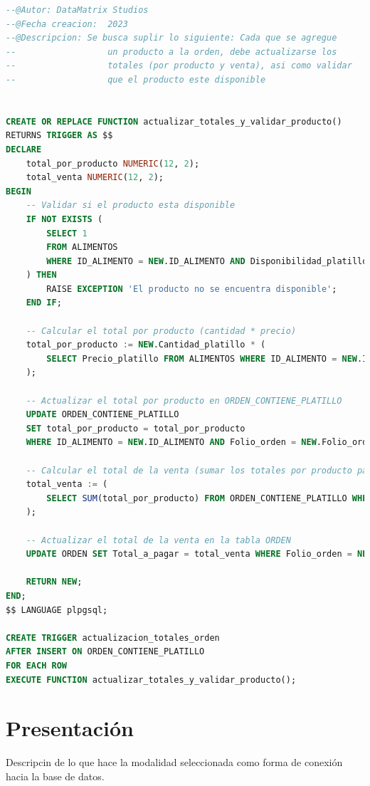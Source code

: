 \documentclass[12pt, letterpaper]{article} %
\begin{document}
\begin{lstlisting}[language=SQL, caption=Creación del trigger.]
--@Autor: DataMatrix Studios
--@Fecha creacion:  2023
--@Descripcion: Se busca suplir lo siguiente: Cada que se agregue
--                  un producto a la orden, debe actualizarse los
--                  totales (por producto y venta), asi como validar
--                  que el producto este disponible


CREATE OR REPLACE FUNCTION actualizar_totales_y_validar_producto() 
RETURNS TRIGGER AS $$
DECLARE
    total_por_producto NUMERIC(12, 2);
    total_venta NUMERIC(12, 2);
BEGIN
    -- Validar si el producto esta disponible
    IF NOT EXISTS (
        SELECT 1
        FROM ALIMENTOS
        WHERE ID_ALIMENTO = NEW.ID_ALIMENTO AND Disponibilidad_platillo = 'Disponible'
    ) THEN
        RAISE EXCEPTION 'El producto no se encuentra disponible';
    END IF;

    -- Calcular el total por producto (cantidad * precio)
    total_por_producto := NEW.Cantidad_platillo * (
        SELECT Precio_platillo FROM ALIMENTOS WHERE ID_ALIMENTO = NEW.ID_ALIMENTO
    );

    -- Actualizar el total por producto en ORDEN_CONTIENE_PLATILLO
    UPDATE ORDEN_CONTIENE_PLATILLO 
    SET total_por_producto = total_por_producto 
    WHERE ID_ALIMENTO = NEW.ID_ALIMENTO AND Folio_orden = NEW.Folio_orden;

    -- Calcular el total de la venta (sumar los totales por producto para la orden)
    total_venta := (
        SELECT SUM(total_por_producto) FROM ORDEN_CONTIENE_PLATILLO WHERE Folio_orden = NEW.Folio_orden
    );

    -- Actualizar el total de la venta en la tabla ORDEN
    UPDATE ORDEN SET Total_a_pagar = total_venta WHERE Folio_orden = NEW.Folio_orden;

    RETURN NEW;
END;
$$ LANGUAGE plpgsql;

CREATE TRIGGER actualizacion_totales_orden
AFTER INSERT ON ORDEN_CONTIENE_PLATILLO
FOR EACH ROW
EXECUTE FUNCTION actualizar_totales_y_validar_producto();
\end{lstlisting}

\newpage
\section{Presentación}
Descripcin de lo que hace la modalidad seleccionada como forma de conexión hacia la base de datos.

\newpage
\end{document}
